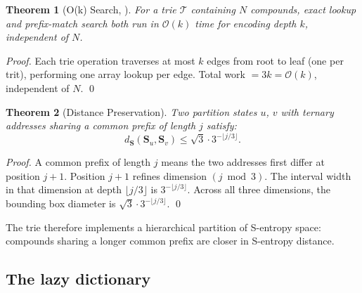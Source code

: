 \documentclass[twocolumn,10pt,a4paper]{article}
\theoremstyle{thmstyle}
\newtheorem{theorem}{Theorem}[section]
\theoremstyle{definition}
\theoremstyle{remark}
\newcommand{\Sv}{\mathbf{S}}
\begin{document}
\begin{theorem}[O(k) Search, \citealp{knuth1998}]
\label{thm:ok-search}
For a trie $\mathcal{T}$ containing $N$ compounds, exact lookup
and prefix-match search both run in $\mathcal{O}(k)$ time for
encoding depth $k$, independent of $N$.
\end{theorem}

\begin{proof}
Each trie operation traverses at most $k$ edges from root to leaf
(one per trit), performing one array lookup per edge. Total work
$= 3k = \mathcal{O}(k)$, independent of $N$. \qed
\end{proof}

\begin{theorem}[Distance Preservation]
\label{thm:trie-distance}
Two partition states $u$, $v$ with ternary addresses sharing a common
prefix of length $j$ satisfy:
\begin{equation}
d_{\Sv}(\Sv_u, \Sv_v) \leq \sqrt{3} \cdot 3^{-\lfloor j/3 \rfloor}.
\label{eq:trie-dist}
\end{equation}
\end{theorem}

\begin{proof}
A common prefix of length $j$ means the two addresses first differ at
position $j+1$. Position $j+1$ refines dimension $(j \bmod 3)$. The
interval width in that dimension at depth $\lfloor j/3\rfloor$ is
$3^{-\lfloor j/3\rfloor}$. Across all three dimensions, the bounding
box diameter is $\sqrt{3} \cdot 3^{-\lfloor j/3\rfloor}$. \qed
\end{proof}

The trie therefore implements a hierarchical partition of S-entropy space:
compounds sharing a longer common prefix are closer in S-entropy distance.

\subsection{The lazy dictionary}
\end{document}
